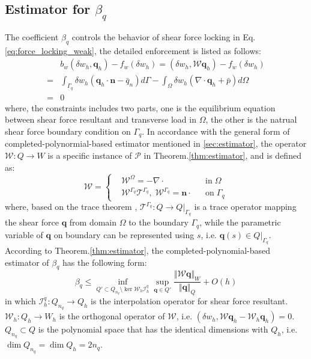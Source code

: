 \subsection{Estimator for $\beta_q$}
The coefficient $\beta_q$ controls the behavior of shear force locking in Eq. \eqref{eq:force_locking_weak}, the detailed enforcement is listed as follows:
\begin{equation}
    \begin{aligned}
        &b_w(\delta w_h, \boldsymbol q_h) - f_w(\delta w_h) = (\delta w_h, \mathcal W \boldsymbol q_h) - f_w(\delta w_h) \\
        =& \int_{\Gamma_q} \delta w_h(\boldsymbol q_h \cdot \boldsymbol n - \bar q_n) d\Gamma - \int_\Omega \delta w_h (\nabla \cdot \boldsymbol q_h + \bar p) d\Omega \\
        =& 0
    \end{aligned}
\end{equation}
where, the constraints includes two parts, one is the equilibrium equation between shear force resultant and  transverse load in $\Omega$, the other is the natrual shear force boundary condition on $\Gamma_q$.
In accordance with the general form of completed-polynormial-based estimator mentioned in \ref{sec:estimator}, 
the operator $\mathcal W: Q\rightarrow W$ is a specific instance of $\mathcal P$ in Theorem.\ref{thm:estimator}, and is defined as:
\begin{equation}\label{eq:operator_W}
\mathcal W = \left \{
    \begin{aligned}
        &\mathcal W^\Omega = -\nabla \cdot & & \textrm{in}\; \Omega \\
        &\mathcal W^{\Gamma_q}\mathcal T^{\Gamma_q}, \; \mathcal W^{\Gamma_q} = \boldsymbol n \cdot & & \textrm{on}\; \Gamma_q
    \end{aligned}
    \right .
\end{equation}
where, based on the trace theorem \cite{}, $\mathcal T^{\Gamma_q}: Q \rightarrow Q\vert_{\Gamma_q}$ is a trace operator mapping the shear force $\boldsymbol q$ from domain $\Omega$ to the boundary $\Gamma_q$, while the parametric variable of $\boldsymbol q$ on boundary can be represented using $s$, i.e. $\boldsymbol q(s) \in Q\vert_{\Gamma_q}$. 
According to Theorem.\ref{thm:estimator}, the completed-polynomial-based estimator of $\beta_q$ has the following form:
\begin{equation}\label{eq:beta_q}
\beta_q \le \inf_{Q'\subset Q_{n_q} \setminus \ker \mathcal W_h \mathcal I_h^q}
\sup_{\boldsymbol q \in Q'}
\frac{\Vert \mathcal W\boldsymbol q \Vert_W}{\Vert \boldsymbol q \Vert_Q} + O(h)
\end{equation}
in which $\mathcal I_h^q:Q_{n_q}\rightarrow Q_h$ is the interpolation operator for shear force resultant.
$\mathcal W_h:Q_h\rightarrow W_h$ is the orthogonal operator of $\mathcal W$, i.e. $(\delta w_h, \mathcal W \boldsymbol q_h - \mathcal W_h \boldsymbol q_h)=0$.
$Q_{n_q}\subset Q$ is the polynomial space that has the identical dimensions with $Q_h$, i.e. $\dim Q_{n_q} = \dim Q_h = 2n_q$.

